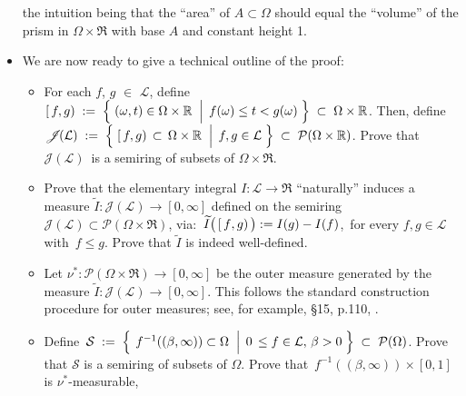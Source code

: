 \begin{itemize}
	the intuition being that the ``area'' of $A \subset \Omega$ should equal the
	``volume'' of the prism in $\Omega \times \Re$ with base $A$ and constant height 1.
\item
	We are now ready to give a technical outline of the proof:
	\begin{itemize}
	\item
		For each $f$, $g$ $\in$ $\mathcal{L}$, define
		\,$[\,f,g)
		\; := \;
			\left\{\,
			\left.
			(\omega,t) \overset{{\color{white}.}}{\in} \Omega \times \Re
			\;\;\right\vert\;
			f(\omega) \leq t < g(\omega)
			\;\right\}
		\; \subset \;
		\Omega \times \Re$.
		\vskip 0.05cm
		Then, define
		$\mathscr{J}\!(\mathcal{L})
		\; := \;
			\left\{\,
			\left.
			[\,f,g) \,\overset{{\color{white}.}}{\subset}\, \Omega \times \Re
			\;\;\right\vert\;
			f,g \in \mathcal{L}
			\;\right\}
		\; \subset \;
			\mathcal{P}\!\left(\Omega \times \Re\right)$.
		\vskip 0.05cm
		Prove that \,$\mathscr{J}\!(\mathcal{L})$\, is a semiring of subsets of $\Omega \times \Re$.
	\item
		Prove that the elementary integral $I : \mathcal{L} \longrightarrow \Re$ ``naturally'' induces
		a measure $\widetilde{I} : \mathscr{J}\!(\mathcal{L}) \longrightarrow [0,\infty]$ defined on the semiring
		$\mathscr{J}\!(\mathcal{L}) \subset \mathcal{P}(\Omega\times\Re)$, via:
		\,$\widetilde{I}\!\left(\,[\,f\!\overset{{\color{white}-}}{,}g)\,\right) := I(g) - I(f)$,\,
		for every $f, g \in \mathcal{L}$\, with \,$f \leq g$.
		\vskip 0.05cm
		Prove that $\widetilde{I}$ is indeed well-defined.
	\item
		Let $\nu^{*} : \mathcal{P}(\Omega\times\Re) \longrightarrow [0,\infty]$ be the outer measure
		generated by the measure $\widetilde{I} : \mathscr{J}\!(\mathcal{L}) \longrightarrow [0,\infty]$.
		\vskip 0.05cm
		This follows the standard construction procedure for outer measures;
		see, for example, \S15, p.110, \cite{Aliprantis1998}.
	\item
		Define
		\,$\mathcal{S}
		\; := \;
			\left\{\;\left.
				f^{-1}((\beta,\infty)) \overset{{\color{white}.}}{\subset} \Omega
			\;\;\right\vert\;
				0 \,\leq f \in \mathcal{L},\, \beta > 0
			\;\right\}
		\;\subset\;
			\mathcal{P}(\Omega)$.
		\vskip 0.05cm
		Prove that $\mathcal{S}$ is a semiring of subsets of $\Omega$.
		\vskip 0.05cm
		Prove that \,$f^{-1}((\beta,\infty)) \times [0,1]$\, is $\nu^{*}$-measurable,

\end{itemize}
\end{itemize}
